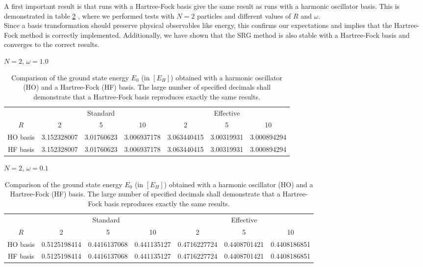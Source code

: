 A first important result is that runs with a Hartree-Fock basis give the same result as runs with a harmonic oscillator basis. This is demonstrated in table \ref{tab:HFtest} , where we performed tests with $N=2$ particles and different values of $R$ and $\omega$.\\
Since a basis transformation should preserve physical observables like energy, this confirms our expectations and implies that the Hartree-Fock method is correctly implemented. Additionally, we have shown that the SRG method is also stable with a Hartree-Fock basis and converges to the correct results.

\begin{table}
{\small
\begin{center}
$N=2,\,\omega = 1.0$
\vspace{11pt}
\begin{tabular}{|c||c|c|c||c|c|c|}
\hline
  & \multicolumn{3}{|c||}{Standard} & \multicolumn{3}{|c|}{Effective}\\
$R$ & 2& 5& 10& 2 & 5 & 10  \\
\hline
HO basis &3.152328007 &3.01760623 & 3.006937178 & 3.063440415 &3.00319931 & 3.000894294\\
\hline
HF basis & 3.152328007 &3.01760623 &3.006937178 &3.063440415 &3.00319931 & 3.000894294\\
\hline
\end{tabular}

$N=2,\,\omega = 0.1$
\vspace*{5pt}
{\tabcolsep=0.12cm
\begin{tabular}{|c||c|c|c||c|c|c|}
\hline
  & \multicolumn{3}{|c||}{Standard} & \multicolumn{3}{|c|}{Effective}\\

$R$ & 2& 5& 10& 2 & 5 & 10  \\
\hline 
HO basis &  0.5125198414&0.4416137068 &0.441135127  &0.4716227724  & 0.4408701421&  0.4408186851\\
\hline
HF basis & 0.5125198414 & 0.4416137068 &0.441135127 & 0.4716227724& 0.4408701421 &  0.4408186851 \\
\hline
\end{tabular}
}
\end{center}
}
\caption{Comparison of the ground state energy $E_0$ (in $\left[ E_H \right]$) obtained with a harmonic oscillator (HO) and a Hartree-Fock (HF) basis. The large number of  specified decimals shall demonstrate that a Hartree-Fock basis reproduces exactly the same results.}
\label{tab:HFtest}
\end{table}


